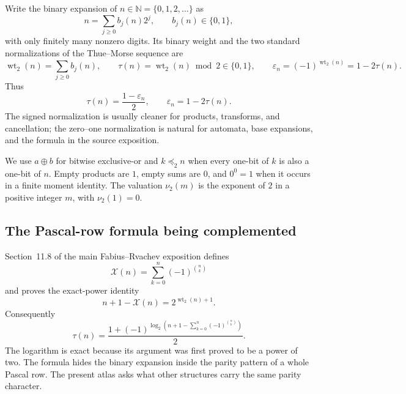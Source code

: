 \documentclass[11pt,oneside]{article}
\numberwithin{equation}{section}
\theoremstyle{definition}
\theoremstyle{remark}
\newcommand{\N}{\mathbb N}
\newcommand{\wt}{\operatorname{wt}_2}
\newcommand{\vtwo}{\nu_2}
\newcommand{\eps}{\varepsilon}
\newcommand{\xor}{\mathbin{\oplus}}
\newcommand{\submask}{\mathrel{\preccurlyeq_2}}
\begin{document}
Write the binary expansion of \(n\in\N=\{0,1,2,\ldots\}\) as
\begin{equation}
  n=\sum_{j\ge0}b_j(n)2^j,
  \qquad b_j(n)\in\{0,1\},
  \label{eq:binary-expansion}
\end{equation}
with only finitely many nonzero digits.  Its binary weight and the two standard
normalizations of the Thue--Morse sequence are
\begin{equation}
  \wt(n)=\sum_{j\ge0}b_j(n),
  \qquad
  \tau(n)=\wt(n)\bmod2\in\{0,1\},
  \qquad
  \eps_n=(-1)^{\wt(n)}=1-2\tau(n).
  \label{eq:normalizations}
\end{equation}
Thus
\begin{equation}
  \tau(n)=\frac{1-\eps_n}{2},
  \qquad
  \eps_n=1-2\tau(n).
  \label{eq:normalization-bridge}
\end{equation}
The signed normalization is usually cleaner for products, transforms, and
cancellation; the zero--one normalization is natural for automata, base
expansions, and the formula in the source exposition.

We use \(a\xor b\) for bitwise exclusive-or and \(k\submask n\) when every
one-bit of \(k\) is also a one-bit of \(n\).  Empty products are \(1\), empty
sums are \(0\), and \(0^0=1\) when it occurs in a finite moment identity.
The valuation \(\vtwo(m)\) is the exponent of \(2\) in a positive integer
\(m\), with \(\vtwo(1)=0\).

\subsection{The Pascal-row formula being complemented}

Section~11.8 of the main Fabius--Rvachev exposition defines
\begin{equation}
  \mathcal X(n)=\sum_{k=0}^{n}(-1)^{\binom nk}
  \label{eq:source-X}
\end{equation}
and proves the exact-power identity
\begin{equation}
  n+1-\mathcal X(n)=2^{\wt(n)+1}.
  \label{eq:source-power}
\end{equation}
Consequently
\begin{equation}
  \tau(n)=
  \frac{1+(-1)^{\log_2\!\left(n+1-
       \sum_{k=0}^{n}(-1)^{\binom nk}\right)}}{2}.
  \label{eq:source-binomial-log}
\end{equation}
The logarithm is exact because its argument was first proved to be a power of
two.  The formula hides the binary expansion inside the parity pattern of a
whole Pascal row.  The present atlas asks what other structures carry the same
parity character.
\end{document}
